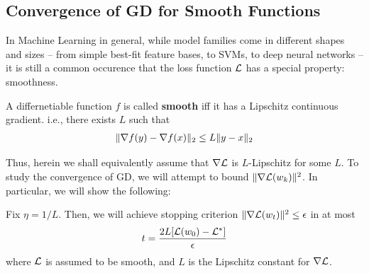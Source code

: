 \subsection{Convergence of GD for Smooth Functions}
In Machine Learning in general, while model families come in different shapes and sizes -- from simple best-fit feature bases, to SVMs, to deep neural networks -- it is still a common occurence that the loss function $\mathcal{L}$ has a special property: smoothness.
\begin{defn}
A differnetiable function $f$ is called \textbf{smooth} iff it has a Lipschitz continuous gradient. i.e., there exists $L$ such that
\begin{align*}
    \lVert \nabla f(y) - \nabla f(x) \rVert_2 \leq L \lVert y - x \rVert_2
\end{align*}
\end{defn}
Thus, herein we shall equivalently assume that $\nabla \mathcal{L}$ is $L$-Lipschitz for some $L$. To study the convergence of GD, we will attempt to bound $\lVert \nabla \mathcal{L}(w_k) \rVert^2$. In particular, we will show the following:
\begin{mdframed}
\begin{theorem}
Fix $\eta = 1/L$. Then, we will achieve stopping criterion $\lVert \nabla \mathcal{L}(w_t) \rVert^2 \leq \epsilon$ in at most
\begin{align*}
    t = \frac{2L[\mathcal{L}(w_0) - \mathcal{L}^*]}{\epsilon}
\end{align*}
where $\mathcal{L}$ is assumed to be smooth, and $L$ is the Lipschitz constant for $\nabla \mathcal{L}$.
\end{theorem}
\end{mdframed}

